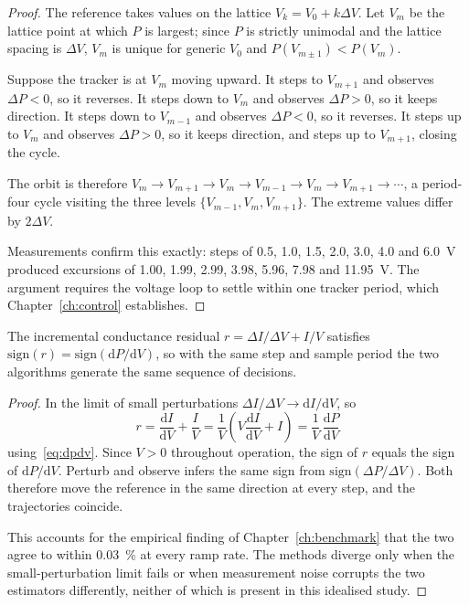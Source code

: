 \begin{proof}
The reference takes values on the lattice $V_k = V_0 + k\Delta V$. Let $V_m$ be
the lattice point at which $P$ is largest; since $P$ is strictly unimodal and
the lattice spacing is $\Delta V$, $V_m$ is unique for generic $V_0$ and
$P(V_{m\pm1}) < P(V_m)$.

Suppose the tracker is at $V_m$ moving upward. It steps to $V_{m+1}$ and
observes $\Delta P < 0$, so it reverses. It steps down to $V_m$ and observes
$\Delta P > 0$, so it keeps direction. It steps down to $V_{m-1}$ and observes
$\Delta P < 0$, so it reverses. It steps up to $V_m$ and observes
$\Delta P > 0$, so it keeps direction, and steps up to $V_{m+1}$, closing the
cycle.

The orbit is therefore
$V_m \to V_{m+1} \to V_m \to V_{m-1} \to V_m \to V_{m+1} \to \cdots$, a
period-four cycle visiting the three levels $\{V_{m-1}, V_m, V_{m+1}\}$. The
extreme values differ by $2\Delta V$.

Measurements confirm this exactly: steps of \SI{0.5}{}, \SI{1.0}{}, \SI{1.5}{},
\SI{2.0}{}, \SI{3.0}{}, \SI{4.0}{} and \SI{6.0}{\volt} produced excursions of
\SI{1.00}{}, \SI{1.99}{}, \SI{2.99}{}, \SI{3.98}{}, \SI{5.96}{}, \SI{7.98}{} and
\SI{11.95}{\volt}. The argument requires the voltage loop to settle within one
tracker period, which Chapter~\ref{ch:control} establishes.
\end{proof}

\begin{proposition}
\label{prop:incequiv}
The incremental conductance residual $r = \Delta I/\Delta V + I/V$ satisfies
$\mathrm{sign}(r) = \mathrm{sign}(\mathrm{d}P/\mathrm{d}V)$, so with the same
step and sample period the two algorithms generate the same sequence of
decisions.
\end{proposition}

\begin{proof}
In the limit of small perturbations $\Delta I/\Delta V \to \mathrm{d}I/\mathrm{d}V$, so
\[
r = \frac{\mathrm{d}I}{\mathrm{d}V} + \frac{I}{V}
  = \frac{1}{V}\left(V\frac{\mathrm{d}I}{\mathrm{d}V} + I\right)
  = \frac{1}{V}\,\frac{\mathrm{d}P}{\mathrm{d}V}
\]
using~\eqref{eq:dpdv}. Since $V > 0$ throughout operation, the sign of $r$
equals the sign of $\mathrm{d}P/\mathrm{d}V$. Perturb and observe infers the
same sign from $\mathrm{sign}(\Delta P/\Delta V)$. Both therefore move the
reference in the same direction at every step, and the trajectories coincide.

This accounts for the empirical finding of Chapter~\ref{ch:benchmark} that the
two agree to within \SI{0.03}{\percent} at every ramp rate. The methods diverge
only when the small-perturbation limit fails or when measurement noise corrupts
the two estimators differently, neither of which is present in this idealised
study.
\end{proof}

